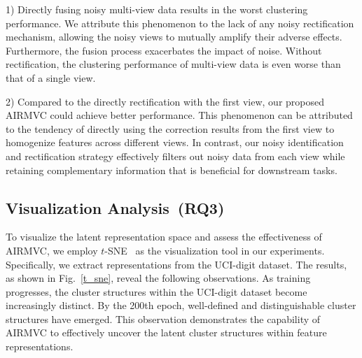 \documentclass{article}
\theoremstyle{plain}
\theoremstyle{definition}
\theoremstyle{remark}
\begin{document}
1) Directly fusing noisy multi-view data results in the worst clustering performance. We attribute this phenomenon to the lack of any noisy rectification mechanism, allowing the noisy views to mutually amplify their adverse effects. Furthermore, the fusion process exacerbates the impact of noise. Without rectification, the clustering performance of multi-view data is even worse than that of a single view. 

2) Compared to the directly rectification with the first view, our proposed AIRMVC could achieve better performance. This phenomenon can be attributed to the tendency of directly using the correction results from the first view to homogenize features across different views. In contrast, our noisy identification and rectification strategy effectively filters out noisy data from each view while retaining complementary information that is beneficial for downstream tasks.




\subsection{Visualization Analysis~\textbf{(RQ3)}}

To visualize the latent representation space and assess the effectiveness of AIRMVC, we employ $t$-SNE~\cite{TSNE} as the visualization tool in our experiments. Specifically, we extract representations from the UCI-digit dataset. The results, as shown in Fig.~\ref{t_sne}, reveal the following observations. As training progresses, the cluster structures within the UCI-digit dataset become increasingly distinct. By the 200th epoch, well-defined and distinguishable cluster structures have emerged. This observation demonstrates the capability of AIRMVC to effectively uncover the latent cluster structures within feature representations.
\end{document}
